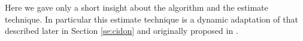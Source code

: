 \documentclass[11pt,a4paper,twoside,openright]{book}
\begin{document}
Here we gave only a short insight about the algorithm and the estimate technique. In particular this estimate technique is a dynamic adaptation of that described later in Section \ref{se:cidon} and originally proposed in \cite{cidon}.\\

\end{document}
